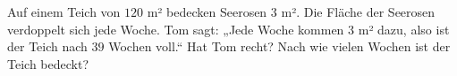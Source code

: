 \documentclass[11pt]{article}
\makeatletter
\newcommand{\aufg}[3]{\par\noindent\makebox[0pt][r]{#3}\begin{minipage}[t]{\linewidth}#1\end{minipage}\par}
\newcommand{\nr}[1]{\makebox[7mm][l]{\textbf{#1}}}
\newlength{\kr}
\newcommand{\karomerk}[2]{\protected@write\@auxout{}{\string\karoseite{#1}{#2}{\thepage}}}
\newcommand{\karoseite}[3]{\expandafter\xdef\csname karo@#1@#2\endcsname{#3}}
\makeatother
\begin{document}
\medskip
\aufg{\nr{4.}Auf einem Teich von $120$ m² bedecken Seerosen $3$ m². Die Fläche der Seerosen verdoppelt sich jede Woche. Tom sagt: „Jede Woche kommen $3$ m² dazu, also ist der Teich nach $39$ Wochen voll.“ Hat Tom recht? Nach wie vielen Wochen ist der Teich bedeckt?}{}{{\scriptsize\color{mbgrau}Ziel\hspace{2mm}}}
\medskip
\par\vspace{3mm}\setlength{\kr}{\dimexpr\pagegoal-\pagetotal-10mm\relax}%
\ifdim\kr>12mm\karomerk{k}{T}\noindent{\scriptsize\color{mbgrau}Platz zum Rechnen}\par\nointerlineskip\vspace{1mm}\noindent
\begin{tikzpicture}\clip (0,0) rectangle ({\linewidth-0.5mm},\kr);\draw[black!16,line width=0.3pt,step=5mm] (0,0) grid (\linewidth,\kr);\end{tikzpicture}\fi\par
\end{document}
